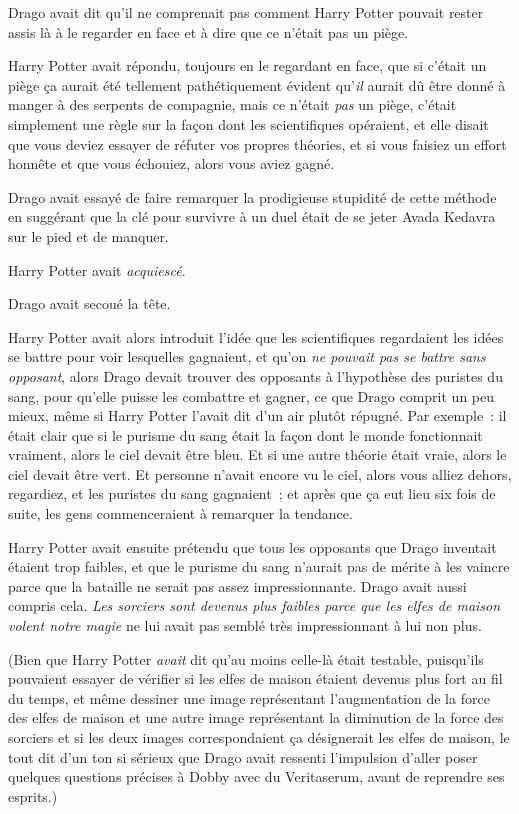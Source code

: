 Drago avait dit qu'il ne comprenait pas comment Harry Potter pouvait rester assis là à le regarder en face et à dire que ce n'était pas un piège.

Harry Potter avait répondu, toujours en le regardant en face, que si c'était un piège ça aurait été tellement pathétiquement évident qu'\emph{il} aurait dû être donné à manger à des serpents de compagnie, mais ce n'était \emph{pas} un piège, c'était simplement une règle sur la façon dont les scientifiques opéraient, et elle disait que vous deviez essayer de réfuter vos propres théories, et si vous faisiez un effort honnête et que vous échouiez, alors vous aviez gagné.

Drago avait essayé de faire remarquer la prodigieuse stupidité de cette méthode en suggérant que la clé pour survivre à un duel était de se jeter Avada Kedavra sur le pied et de manquer.

Harry Potter avait \emph{acquiescé}.

Drago avait secoué la tête.

Harry Potter avait alors introduit l'idée que les scientifiques regardaient les idées se battre pour voir lesquelles gagnaient, et qu'on \emph{ne pouvait pas se battre sans opposant}, alors Drago devait trouver des opposants à l'hypothèse des puristes du sang, pour qu'elle puisse les combattre et gagner, ce que Drago comprit un peu mieux, même si Harry Potter l'avait dit d'un air plutôt répugné. Par exemple~: il était clair que si le purisme du sang était la façon dont le monde fonctionnait vraiment, alors le ciel devait être bleu. Et si une autre théorie était vraie, alors le ciel devait être vert. Et personne n'avait encore vu le ciel, alors vous alliez dehors, regardiez, et les puristes du sang gagnaient~; et après que ça eut lieu six fois de suite, les gens commenceraient à remarquer la tendance.

Harry Potter avait ensuite prétendu que tous les opposants que Drago inventait étaient trop faibles, et que le purisme du sang n'aurait pas de mérite à les vaincre parce que la bataille ne serait pas assez impressionnante. Drago avait aussi compris cela. \emph{Les sorciers sont devenus plus faibles parce que les elfes de maison volent notre magie} ne lui avait pas semblé très impressionnant à lui non plus.

(Bien que Harry Potter \emph{avait} dit qu'au moins celle-là était testable, puisqu'ils pouvaient essayer de vérifier si les elfes de maison étaient devenus plus fort au fil du temps, et même dessiner une image représentant l'augmentation de la force des elfes de maison et une autre image représentant la diminution de la force des sorciers et si les deux images correspondaient ça désignerait les elfes de maison, le tout dit d'un ton si sérieux que Drago avait ressenti l'impulsion d'aller poser quelques questions précises à Dobby avec du Veritaserum, avant de reprendre ses esprits.)

